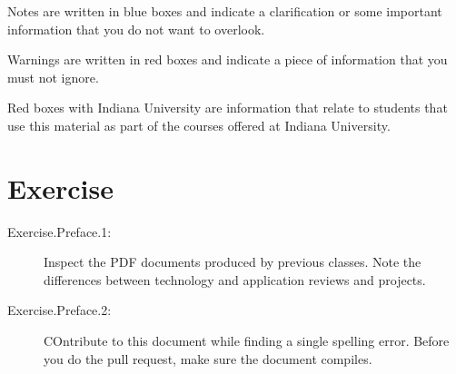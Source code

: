 \begin{NOTE}
Notes are written in blue boxes and indicate a clarification or some
important information that you do not want to overlook.
\end{NOTE}

\begin{WARNING}
Warnings are written in red  boxes and indicate a piece of information
that you must not ignore.
\end{WARNING}

\begin{IU}
Red boxes with Indiana University are information that relate to
students that use this material as part of the courses offered at
Indiana University.
\end{IU}



\section{Exercise}

\begin{description}
\item[Exercise.Preface.1:] Inspect the PDF documents produced by previous
classes. Note the differences between technology and application
reviews and projects. 
\item[Exercise.Preface.2:] COntribute to this document while finding a
  single spelling error. Before you do the pull request, make sure the
  document compiles.
\end{description}


